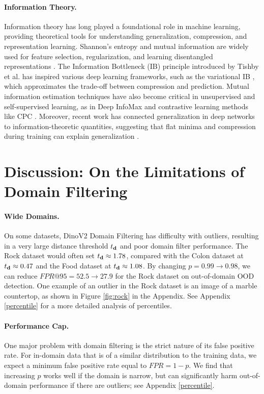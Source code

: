 \documentclass[letterpaper]{article} %
\theoremstyle{plain}
\theoremstyle{definition}
\theoremstyle{remark}
\begin{document}
\paragraph{Information Theory. }
Information theory has long played a foundational role in machine learning, providing theoretical tools for understanding generalization, compression, and representation learning. Shannon’s entropy and mutual information are widely used for feature selection, regularization, and learning disentangled representations \cite{shannon1948mathematical,cover2006elements}. The Information Bottleneck (IB) principle introduced by Tishby et al. \cite{tishby2000information} has inspired various deep learning frameworks, such as the variational IB \cite{alemi2016deep}, which approximates the trade-off between compression and prediction. Mutual information estimation techniques have also become critical in unsupervised and self-supervised learning, as in Deep InfoMax \cite{hjelm2018learning} and contrastive learning methods like CPC \cite{oord2018representation}. Moreover, recent work has connected generalization in deep networks to information-theoretic quantities, suggesting that flat minima and compression during training can explain generalization \cite{shwartz2017opening,achille2018emergence}.


\section{Discussion: On the Limitations of Domain Filtering}
\label{discussion}

\paragraph{Wide Domains.} On some datasets, DinoV2 Domain Filtering has difficulty with outliers, resulting in a very large distance threshold $t_{\mathbf{d}}$ and poor domain filter performance. The Rock dataset \citep{rock_data} would often set $t_{\mathbf{d}} \approx 1.78$, compared with the Colon dataset at $t_{\mathbf{d}} \approx 0.47$ and the Food dataset at $t_{\mathbf{d}} \approx 1.08$. By changing $p=0.99\to0.98$, we can reduce $FPR@95=52.5\to27.9 $ for the Rock dataset on out-of-domain OOD detection. One example of an outlier in the Rock dataset is an image of a marble countertop, as shown in Figure \ref{fig:rock} in the Appendix. See Appendix \ref{percentile} for a more detailed analysis of percentiles. %

\paragraph{Performance Cap.} One major problem with domain filtering is the strict nature of its false positive rate. For in-domain data that is of a similar distribution to the training data, we expect a minimum false positive rate equal to $FPR = 1 - p$. We find that increasing $p$ works well if the domain is narrow, but can significantly harm out-of-domain performance if there are outliers; see Appendix \ref{percentile}.
\end{document}
